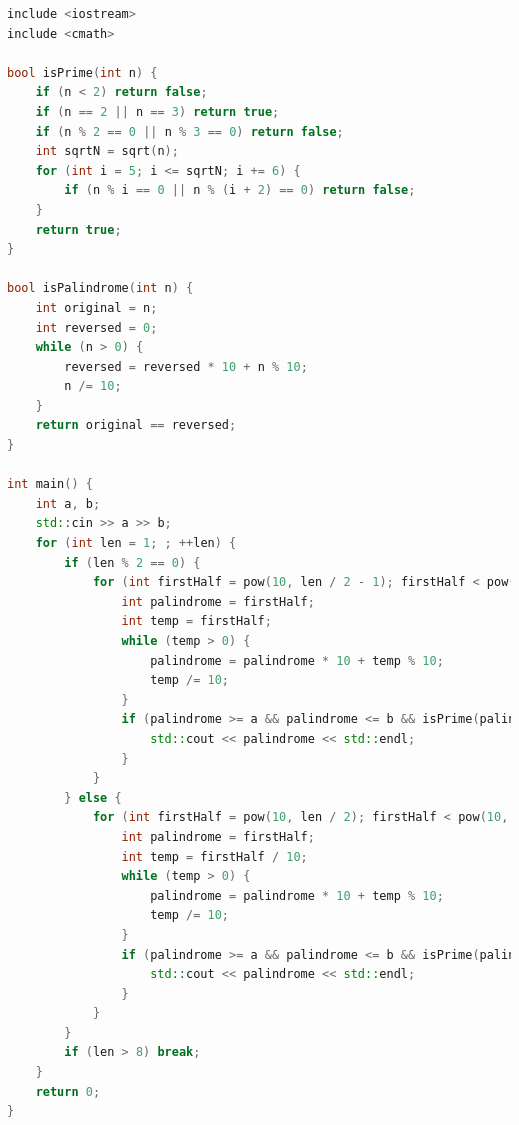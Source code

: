 \documentclass[12pt,twiside,a4paper]{ctexbook}
\numberwithin{chapter}{part}
\begin{document}
\begin{lstlisting}[language=C++,breaklines=true]
include <iostream>
include <cmath>

bool isPrime(int n) {
    if (n < 2) return false;
    if (n == 2 || n == 3) return true;
    if (n % 2 == 0 || n % 3 == 0) return false;
    int sqrtN = sqrt(n);
    for (int i = 5; i <= sqrtN; i += 6) {
        if (n % i == 0 || n % (i + 2) == 0) return false;
    }
    return true;
}

bool isPalindrome(int n) {
    int original = n;
    int reversed = 0;
    while (n > 0) {
        reversed = reversed * 10 + n % 10;
        n /= 10;
    }
    return original == reversed;
}

int main() {
    int a, b;
    std::cin >> a >> b;
    for (int len = 1; ; ++len) {
        if (len % 2 == 0) {
            for (int firstHalf = pow(10, len / 2 - 1); firstHalf < pow(10, len / 2); ++firstHalf) {
                int palindrome = firstHalf;
                int temp = firstHalf;
                while (temp > 0) {
                    palindrome = palindrome * 10 + temp % 10;
                    temp /= 10;
                }
                if (palindrome >= a && palindrome <= b && isPrime(palindrome)) {
                    std::cout << palindrome << std::endl;
                }
            }
        } else {
            for (int firstHalf = pow(10, len / 2); firstHalf < pow(10, len / 2 + 1); ++firstHalf) {
                int palindrome = firstHalf;
                int temp = firstHalf / 10;
                while (temp > 0) {
                    palindrome = palindrome * 10 + temp % 10;
                    temp /= 10;
                }
                if (palindrome >= a && palindrome <= b && isPrime(palindrome)) {
                    std::cout << palindrome << std::endl;
                }
            }
        }
        if (len > 8) break;
    }
    return 0;
}
\end{lstlisting}
\end{document}
